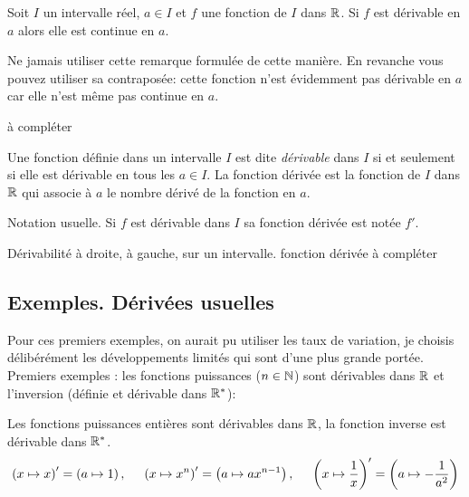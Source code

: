 \begin{prop}
  Soit $I$ un intervalle réel, $a\in I$ et $f$ une fonction de $I$ dans $\mathbb{R}$. Si $f$ est dérivable en $a$ alors elle est continue en $a$.
\end{prop}
\begin{rem}
 Ne jamais utiliser cette remarque formulée de cette manière. En revanche vous pouvez utiliser sa contraposée: \og cette fonction n'est évidemment pas dérivable en $a$ car elle n'est même pas continue en $a$\fg.
\end{rem}
\begin{demo}
  à compléter
\end{demo}
\begin{defi}
 Une fonction définie dans un intervalle $I$ est dite \emph{dérivable} dans $I$ si et seulement si elle est dérivable en tous les $a\in I$. La fonction dérivée est la fonction de $I$ dans $\mathbb{R}$ qui associe à $a$ le nombre dérivé de la fonction en $a$.
\end{defi}
Notation usuelle. Si $f$ est dérivable dans $I$ sa fonction dérivée est notée $f'$.
   
\begin{defi}
  Dérivabilité à droite, à gauche, sur un intervalle. fonction dérivée \newline
  à compléter
\end{defi}


\subsection{Exemples. Dérivées usuelles}
Pour ces premiers exemples, on aurait pu utiliser les taux de variation, je choisis délibérément les développements limités qui sont d'une plus grande portée.
Premiers exemples : les fonctions puissances ($n \in \mathbb{N}$) sont dérivables dans $\mathbb{R}$ et l'inversion (définie et dérivable dans $\mathbb{R}^*$):
\begin{prop}
Les fonctions puissances entières sont dérivables dans $\mathbb{R}$, la fonction inverse est dérivable dans $\mathbb{R}^*$.
\begin{displaymath}
  \left( x\mapsto x\right)' = \left( a\mapsto 1\right),\hspace{0.5cm} \left( x\mapsto x^n\right)' = \left( a\mapsto ax^{n-1}\right),\hspace{0.5cm}
  \left( x\mapsto \frac{1}{x}\right)' = \left(a\mapsto -\frac{1}{a^2} \right)
\end{displaymath} 
\end{prop}

